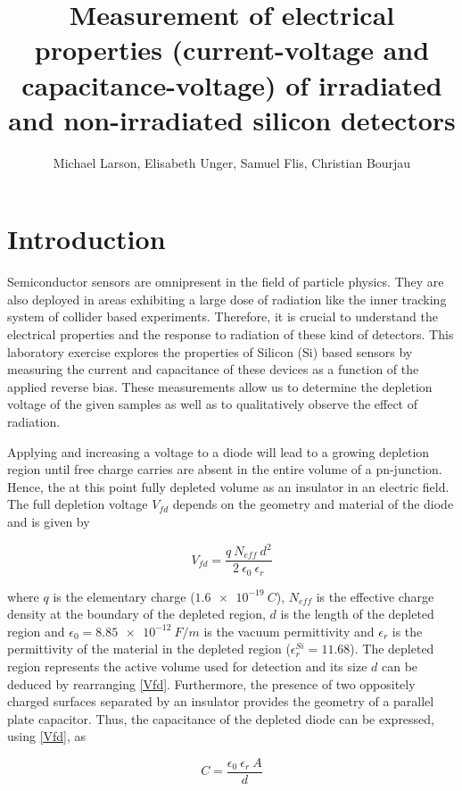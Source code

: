 \documentclass[11pt]{report}
\title{Measurement of electrical properties (current-voltage and capacitance-voltage) of irradiated and non-irradiated silicon detectors}
\author{Michael Larson, Elisabeth Unger, Samuel Flis, Christian Bourjau}
\begin{document}
\maketitle

\section{Introduction}
\label{sec:introduction}

Semiconductor sensors are omnipresent in the field of particle physics.
They are also deployed in areas exhibiting a large dose of radiation like the inner tracking system of collider based experiments.
Therefore, it is crucial to understand the electrical properties and the response to radiation of these kind of detectors.
This laboratory exercise explores the  properties of Silicon (Si) based sensors by measuring the current and capacitance of these devices as a function of the applied reverse bias.
These measurements allow us to determine the depletion voltage of the given samples as well as to qualitatively observe the effect of radiation.

Applying and increasing a voltage to a diode will lead to a growing depletion region until free charge carries are absent in the entire volume of a pn-junction. Hence, the at this point fully depleted volume as an insulator in an electric field. The full depletion voltage $V_{fd}$ depends on the geometry and material of the diode and is given by 

\begin{equation}
  \label{Vfd}
  V_{fd} = \frac{q ~ N_{eff} ~ d^2}{2 ~ \epsilon_0 ~ \epsilon_r}
\end{equation}

where $q$ is the elementary charge ($\SI{1.6e-19}{C}$), $N_{eff}$ is the effective charge density at the boundary of the depleted region, $d$ is the length of the depleted region and $\epsilon_0 = \SI{8.85e-12}{F/m}$ is the vacuum permittivity and $\epsilon_r$ is the permittivity of the material in the depleted region ($\epsilon_r^{Si} = 11.68$).
The depleted region represents the active volume used for detection and its size $d$ can be deduced by rearranging \eqref{Vfd}. 
Furthermore, the presence of two oppositely charged surfaces separated by an insulator provides the geometry of a parallel plate capacitor. Thus, the capacitance of the depleted diode can be expressed, using \eqref{Vfd}, as

\begin{equation}
  \label{C}
  C = \frac{\epsilon_{0} ~ \epsilon_{r} ~ A}{d}
\end{equation}
\end{document}
